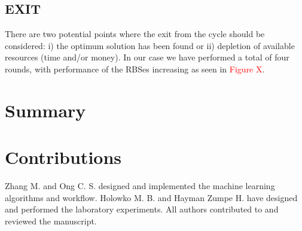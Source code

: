 \documentclass{article}
\begin{document}
\subsection{EXIT}
There are two potential points where the exit from the cycle should be considered: i) the optimum solution has been found or ii) depletion of available resources (time and/or money). In our case we have performed a total of four rounds, with performance of the RBSes increasing as seen in \textcolor{red}{Figure X}.\\

\section{Summary}

\section{Contributions}
Zhang M. and Ong C. S. designed and implemented the machine learning algorithms and workflow. Holowko M. B. and Hayman Zumpe H. have designed and performed the laboratory experiments. All authors contributed to and reviewed the manuscript.


\newpage

\printbibliography

\clearpage

\appendix

\end{document}
